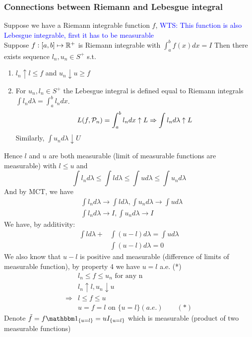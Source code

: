 \subsubsection*{Connections between Riemann and Lebesgue integral}Suppose we have a Riemann integrable function $f$, \textcolor{blue}{WTS: This function is also Lebesgue integrable, first it has to be measurable} \\
Suppose $f:[a,b] \mapsto \mathbb{R}^+$ is Riemann integrable with $\int_a^b f(x) dx = I$ Then there exists sequence $l_n, u_n \in S^+$ s.t.
\begin{enumerate}
    \item $l_n \uparrow l \leq f$ and $u_n \downarrow u \geq f$
    \item For $u_n, l_n\in S^+$ the Lebesgue integral is defined equal to Riemann integrals $\int l_n d\lambda = \int_a^b l_n dx$. 
    \begin{equation*}
        L(f,\mathcal{P}_n) = \int_a^b l_n dx \uparrow L \Rightarrow \int l_n d\lambda \uparrow L
    \end{equation*} Similarly, $\int u_n d\lambda \downarrow U$
\end{enumerate}Hence $l$ and $u$ are both measurable (limit of measurable functions are measurable) with $l \leq u$ and 
\begin{equation*}
    \int l_n d\lambda \leq \int l d\lambda \leq \int u d\lambda \leq \int u_n d\lambda 
\end{equation*} And by MCT, we have
\begin{align*}
    &\int l_n d\lambda \rightarrow \int l d\lambda, \int u_n d\lambda \rightarrow \int u d\lambda \\
    &\int l_n d\lambda \rightarrow I, \int u_n d\lambda \rightarrow I
\end{align*} We have, by additivity:
\begin{align*}
    \int l d\lambda +&\int (u-l) d\lambda = \int u d\lambda \\ 
    &\int (u-l) d\lambda = 0
\end{align*}We also know that $u-l$ is positive and measurable (difference of limits of measurable function), by property 4 we have $u = l$ a.e. \hfill (*)
\begin{align*}
    &l_n \leq f \leq u_n \text{ for any n} \\
    & l_n \uparrow l, u_n\downarrow u \\
    \Rightarrow& l \leq f \leq u \\
    &u = f = l \text{ on } \{u=l\} (a.e.) \qquad(*)
\end{align*}Denote $\tilde{f} = f \I_{\{u=l\}} = uI_{\{u=l\}}$ which is measurable (product of two measurable functions) \\
